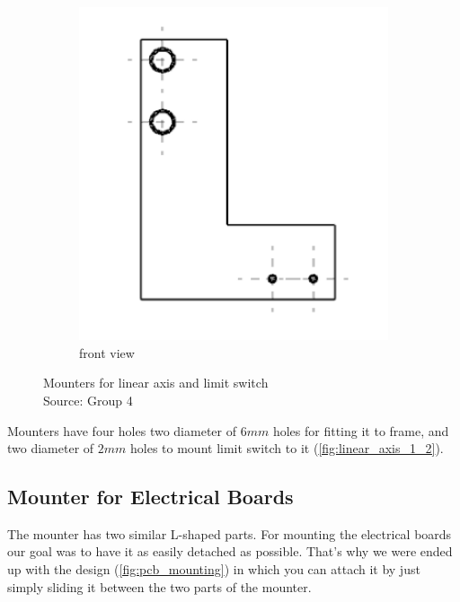 \documentclass[a4paper,12pt]{scrreprt}
\begin{document}
\begin{figure} [H]
\begin{subfigure}[b]{0.45\textwidth}
                \includegraphics[width=1\textwidth]{pictures/linear_axis_2}
                \caption{front view}\label{fig:linear_axis_2}
        \end{subfigure}
        \caption[Mounters for linear axis and limit switch]{Mounters for linear axis and limit switch\\
        Source: Group 4}\label{fig:linear_axis_1_2}
  \end{figure}
Mounters have four holes two diameter of $6mm$ holes for fitting it to frame, and two diameter of $2mm$ holes to mount limit switch to it (\autoref{fig:linear_axis_1_2}). 	

\subsection{Mounter for Electrical Boards}\label{sec:Mounter for electrical boards}
The mounter has two similar L-shaped parts. For mounting the electrical boards our goal was to have it as easily detached as possible. That's why we were ended up with the design (\autoref{fig:pcb_mounting}) in which you can attach it by just simply sliding it between the two parts of the mounter.
\end{document}
